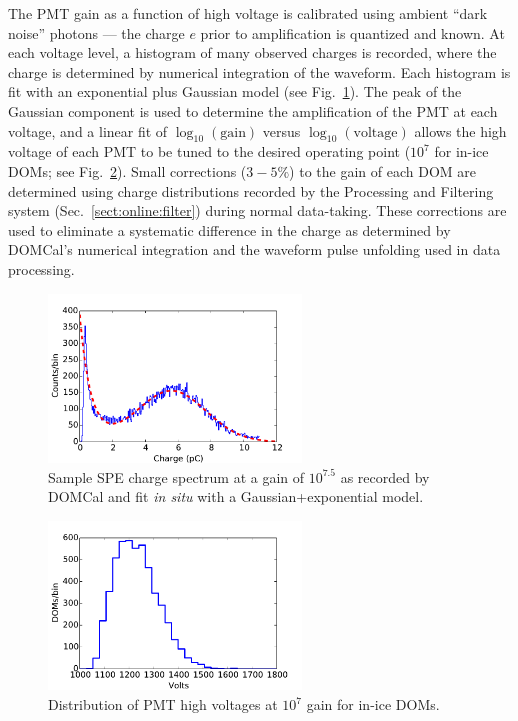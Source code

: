 The PMT gain as a function of high voltage is calibrated using ambient
``dark noise'' photons --- the charge $e$ prior to amplification is quantized
and known.  At each voltage level, a histogram of many observed charges is
recorded, where the charge is determined by numerical integration of the waveform.
Each histogram is fit with an exponential plus Gaussian model (see
Fig.~\ref{fig:domcal_hvfit}).  The peak of the Gaussian component is used to
determine the amplification of the PMT at each voltage, and a linear fit
of $\log_{10}(\mathrm{gain})$ versus $\log_{10}(\mathrm{voltage})$ allows
the high voltage of each PMT to be tuned to the desired operating point ($10^7$
for in-ice DOMs; see Fig.~\ref{fig:domcal_hv_settings}).  Small 
corrections ($3-5\%$) to the gain of each DOM are determined using charge
distributions recorded by the Processing and Filtering system
(Sec.~\ref{sect:online:filter}) during normal data-taking.  These
corrections are used to eliminate a systematic difference in the charge as
determined by DOMCal's numerical integration and the waveform pulse
unfolding used in data processing. 

\begin{figure}[!h]
 \centering
 \includegraphics[width=0.6\textwidth]{graphics/dom/domcal/hvfit.pdf}
 \caption{Sample SPE charge spectrum at a gain of $10^{7.5}$ as recorded by DOMCal and fit
   \textit{in situ} with a Gaussian+exponential model.} 
 \label{fig:domcal_hvfit}
\end{figure}

\begin{figure}[!h]
 \centering
 \includegraphics[width=0.6\textwidth]{graphics/dom/domcal/inice_hv_2016.pdf}
 \caption{Distribution of PMT high voltages at $10^7$ gain for in-ice DOMs.}
 \label{fig:domcal_hv_settings}
\end{figure}

